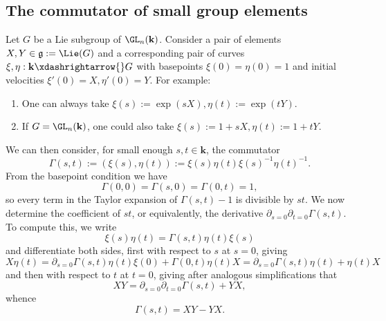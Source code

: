 \documentclass[reqno]{amsart} 
\begin{document}
\subsection{The commutator of small group elements}
\label{sec:org3a6e4da}
Let $G$ be a Lie subgroup of $\GL_n(\mathbf{k})$.
Consider a pair of elements $X,Y \in \mathfrak{g} := \Lie(G)$
and a corresponding pair of curves $\xi, \eta : \mathbf{k}
\xdashrightarrow{} G$
with basepoints $\xi(0) = \eta(0) = 1$
and initial velocities $\xi ' (0) = X,
\eta '(0) = Y$.
For example:
\begin{enumerate}
\item One can always take $\xi(s) := \exp(s X),
\eta(t) := \exp(t Y)$.
\item If $G = \GL_n(\mathbf{k})$,
  one could also take $\xi(s) := 1 + s X, \eta(t) := 1 + t Y$.
\end{enumerate}
We can then consider, for small enough $s,t \in \mathbf{k}$,
the commutator
\begin{equation*}
  \Gamma(s,t) :=
  (\xi(s),\eta(t))
  :=
  \xi(s) \eta(t) \xi(s)^{-1} \eta(t)^{-1}.
\end{equation*}
From the basepoint condition
we have
\begin{equation*}
  \Gamma(0,0) = \Gamma(s,0) = \Gamma(0,t) = 1,
\end{equation*}
so every term in the Taylor expansion of $\Gamma(s,t) - 1$
is divisible by $s t$.
We now determine the coefficient of $s t$,
or equivalently,
the derivative $\partial_{s=0} \partial_{t=0} \Gamma(s,t)$.
To compute this,
we write
\begin{equation*}
  \xi(s) \eta(t) = \Gamma(s,t) \eta(t) \xi(s)
\end{equation*}
and differentiate both sides,
first with respect to $s$ at $s=0$,
giving
\begin{equation*}
  X \eta(t) = \partial_{s=0} \Gamma(s,t) \eta(t) \xi(0)
  + \Gamma(0,t) \eta(t) X
  =
  \partial_{s=0} \Gamma(s,t) \eta(t)
  + \eta(t) X
\end{equation*}
and then with respect to $t$ at $t=0$,
giving after analogous simplifications that
\begin{equation*}
  X Y = \partial_{s=0} \partial_{t=0} \Gamma(s,t)
  + Y X,
\end{equation*}
whence
\begin{equation*}
  \Gamma(s,t) = X Y - Y X.
\end{equation*}
\end{document}
